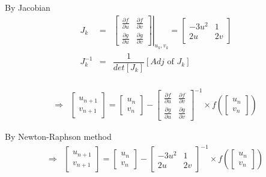\documentclass[a4paper,11pt]{article}
\begin{document}
By Jacobian 
\[ \begin{array}{rcl}
     J_k &=& \left.\left[\begin{array}{cc} \frac{\partial f}{\partial u} & \frac{\partial f}{\partial v} \\ [2mm] \frac{\partial g}{\partial u} & \frac{\partial g}{\partial v}  \end{array}\right]\right|_{u_k,v_k} = \left[ \begin{array}{rr} -3 u^2 & 1 \\ 2u & 2v \end{array} \right] \\ [2mm]
     J_{k}^{-1} &=& \dfrac{1}{det[J_k]} [Adj \text{ of } J_k] \\ [4mm]
\end{array} \]

\[ \begin{array}{ll}
    \Rightarrow & \begin{bmatrix} u_{n+1} \\ v_{n+1} \end{bmatrix} = \begin{bmatrix} u_n \\ v_n  \end{bmatrix} - \left[\begin{array}{cc} \frac{\partial f}{\partial u} & \frac{\partial f}{\partial v} \\ [2mm] \frac{\partial g}{\partial u} & \frac{\partial g}{\partial v}  \end{array}\right]^{-1} \times f\left(\begin{bmatrix} u_n \\ v_n \end{bmatrix}\right) 
\end{array} \]

By Newton-Raphson method 
\[ \begin{array}{ll}
    \Rightarrow & \begin{bmatrix} u_{n+1} \\ v_{n+1} \end{bmatrix} = \begin{bmatrix} u_n \\ v_n  \end{bmatrix} - \begin{bmatrix} -3u^2 & 1  \\ 2u & 2v  \end{bmatrix}^{-1} \times f\left(\begin{bmatrix} u_n \\ v_n \end{bmatrix}\right) 
\end{array} \]
\end{document}
